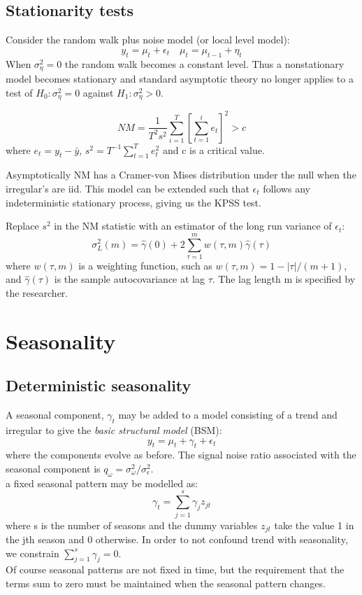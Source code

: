 \documentclass[DIV=14,titlepage=false]{scrreprt}
\begin{document}
\subsection{Stationarity tests}
Consider the random walk plus noise model (or local level model):
\[
    y_t = \mu_t + \epsilon_t \quad \mu_t = \mu_{t-1} + \eta_t
\]
When $\sigma^2_\eta = 0$ the random walk becomes a constant level. Thus a nonstationary model becomes stationary and standard asymptotic theory no longer applies to a test of $H_0: \sigma^2_\eta = 0$ against $H_1: \sigma^2_\eta > 0$. 
\begin{definition}
    \[
        NM = \frac{1}{T^2 s^2} \sum_{i=1}^T \left[ \sum_{t=1}^i e_t \right]^2>c
    \]
    where $e_t = y_t - \bar y$, $s^2 = T^{-1} \sum_{t=1}^T e_t^2$ and c is a critical value.    
\end{definition}
Asymptotically NM has a Cramer-von Mises distribution under the null when the irregular's are iid. This model can be extended such that $\epsilon_t$ follows any indeterministic stationary process, giving us the KPSS test.
\begin{definition}
    Replace $s^2$ in the NM statistic with an estimator of the long run variance of $\epsilon_t$:
    \[
        \sigma^2_L (m) = \hat \gamma(0) + 2 \sum_{\tau=1}^m w(\tau, m) \hat \gamma(\tau)
    \]
    where $w(\tau, m)$ is a weighting function, such as $w(\tau, m) = 1- |\tau|/(m+1)$, and $\hat \gamma(\tau)$ is the sample autocovariance at lag $\tau$. The lag length m is specified by the researcher.
\end{definition}
\section{Seasonality}
\subsection{Deterministic seasonality}
A seasonal component, $\gamma_t$ may be added to a model consisting of a trend and irregular to give the \textit{basic structural model} (BSM):
\[
    y_t = \mu_t + \gamma_t + \epsilon_t
\]
where the components evolve as before. The signal noise ratio associated with the seasonal component is $q_\omega = \sigma^2_\omega / \sigma^2_\epsilon$.\\
a fixed seasonal pattern may be modelled as:
\[
    \gamma_t = \sum_{j=1}^s \gamma_j z_{jt}
\]
where s is the number of seasons and the dummy variables $z_{jt}$ take the value 1 in the jth season and 0 otherwise. In order to not confound trend with seasonality, we constrain $\sum_{j=1}^{s} \gamma_j = 0$.\\
Of course seasonal patterns are not fixed in time, but the requirement that the terms sum to zero must be maintained when the seasonal pattern changes.
\end{document}
